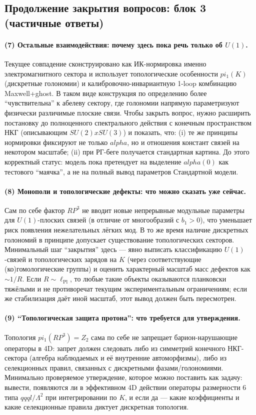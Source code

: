 \documentclass[12pt]{article}
\def\mathbb#1{#1}%
\def\alpha{alpha}%
\def\pi{pi}%
\def\times{x}%
\begin{document}
\subsection*{Продолжение закрытия вопросов: блок 3 (частичные ответы)}

\paragraph{(7) Остальные взаимодействия: почему здесь пока речь только об $U(1)$.}
Текущее совпадение сконструировано как ИК-нормировка именно электромагнитного сектора и использует топологические особенности $\pi_1(K)$ (дискретные голономии) и калибровочно-инвариантную 1-loop комбинацию Maxwell+ghost.
В таком виде конструкция по определению более ``чувствительна'' к абелеву сектору, где голономии напрямую параметризуют физически различимые плоские связи.
Чтобы закрыть вопрос, нужно расширить постановку до полноценного спектрального действия с конечным пространством НКГ (описывающим $SU(2)\times SU(3)$) и показать, что:
(i) те же принципы нормировки фиксируют не только $\alpha$, но и отношения констант связей на некотором масштабе;
(ii) при РГ-беге получается стандартная картина.
До этого корректный статус: модель пока претендует на выделение $\alpha(0)$ как тестового ``маячка'', а не на полный вывод параметров Стандартной модели.

\paragraph{(8) Монополи и топологические дефекты: что можно сказать уже сейчас.}
Сам по себе фактор $\mathbb{RP}^3$ не вводит новые непрерывные модульные параметры для $U(1)$-плоских связей (в отличие от многообразий с $b_1>0$), что уменьшает риск появления нежелательных лёгких мод.
В то же время наличие дискретных голономий в принципе допускает существование топологических секторов.
Минимальный шаг ``закрытия'' здесь --- явно выписать классификацию $U(1)$-связей и топологических зарядов на $K$ (через соответствующие (ко)гомологические группы) и оценить характерный масштаб масс дефектов как $\sim 1/R$.
Если $R\sim \ell_{\mathrm{Pl}}$, то любые такие объекты оказываются планковски тяжёлыми и не противоречат текущим экспериментальным ограничениям; если же стабилизация даёт иной масштаб, этот вывод должен быть пересмотрен.

\paragraph{(9) ``Топологическая защита протона'': что требуется для утверждения.}
Топология $\pi_1(\mathbb{RP}^3)=\mathbb{Z}_2$ сама по себе не запрещает барион-нарушающие операторы в 4D: запрет должен следовать либо из симметрий конечного НКГ-сектора (алгебра наблюдаемых и её внутренние автоморфизмы), либо из селекционных правил, связанных с дискретными фазами/голономиями.
Минимально проверяемое утверждение, которое можно поставить как задачу: вывести, появляются ли в эффективном 4D действии операторы размерности 6 типа $qqql/\Lambda^2$ при интегрировании по $K$, и если да --- какие коэффициенты и какие селекционные правила диктует дискретная топология.
\end{document}
